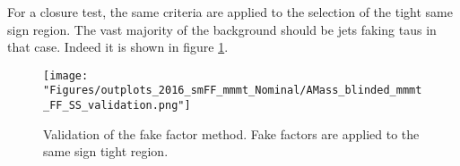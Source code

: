 For a closure test, the same criteria are applied to the selection of the tight same sign region. The vast majority of the background should be jets faking taus in that case. Indeed it is shown in figure \ref{fig:fakefactor_validation}.
  
\begin{figure}[ht!b]
  \texttt{[image: "Figures/outplots\_2016\_smFF\_mmmt\_Nominal/AMass\_blinded\_mmmt\_FF\_SS\_validation.png"]}
    \caption{\label{fig:fakefactor_validation} Validation of the fake factor method. Fake factors are applied to the same sign tight region.}
\end{figure}
